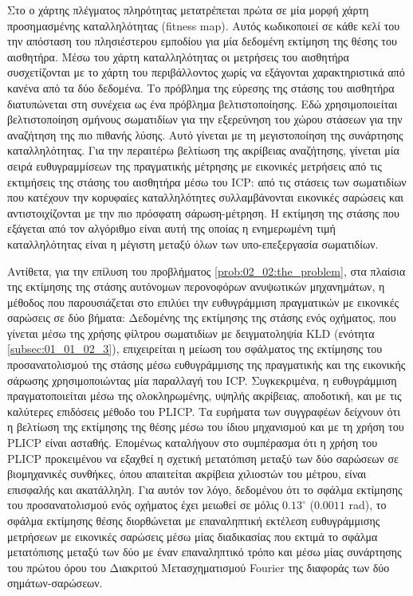 Στο \cite{Zhang2017a} ο χάρτης πλέγματος πληρότητας μετατρέπεται πρώτα σε μία
μορφή χάρτη προσημασμένης καταλληλότητας (fitness map). Αυτός κωδικοποιεί σε
κάθε κελί του την απόσταση του πλησιέστερου εμποδίου για μία δεδομένη εκτίμηση
της θέσης του αισθητήρα. Μέσω του χάρτη καταλληλότητας οι μετρήσεις του
αισθητήρα συσχετίζονται με το χάρτη του περιβάλλοντος χωρίς να εξάγονται
χαρακτηριστικά από κανένα από τα δύο δεδομένα. Το πρόβλημα της εύρεσης της
στάσης του αισθητήρα διατυπώνεται στη συνέχεια ως ένα πρόβλημα βελτιστοποίησης.
Εδώ χρησιμοποιείται βελτιστοποίηση σμήνους σωματιδίων για την εξερεύνηση του
χώρου στάσεων για την αναζήτηση της πιο πιθανής λύσης. Αυτό γίνεται με τη
μεγιστοποίηση της συνάρτησης καταλληλότητας. Για την περαιτέρω βελτίωση της
ακρίβειας αναζήτησης, γίνεται μία σειρά ευθυγραμμίσεων της πραγματικής μέτρησης
με εικονικές μετρήσεις από τις εκτιμήσεις της στάσης του αισθητήρα μέσω του
ICP: από τις στάσεις των σωματιδίων που κατέχουν την κορυφαίες καταλληλότητες
συλλαμβάνονται εικονικές σαρώσεις και αντιστοιχίζονται με την πιο πρόσφατη
σάρωση-μέτρηση. Η εκτίμηση της στάσης που εξάγεται από τον αλγόριθμο είναι
αυτή της οποίας η ενημερωμένη τιμή καταλληλότητας είναι η μέγιστη μεταξύ όλων
των υπο-επεξεργασία σωματιδίων.

Αντίθετα, για την επίλυση του προβλήματος \ref{prob:02_02:the_problem}, στα
πλαίσια της εκτίμησης της στάσης αυτόνομων περονοφόρων ανυψωτικών μηχανημάτων,
η μέθοδος που παρουσιάζεται στο \cite{Vasiljevic2016a} επιλύει την ευθυγράμμιση
πραγματικών με εικονικές σαρώσεις σε δύο βήματα: Δεδομένης της εκτίμησης της
στάσης ενός οχήματος, που γίνεται μέσω της χρήσης φίλτρου σωματιδίων με
δειγματοληψία KLD (ενότητα \ref{subsec:01_01_02_3}), επιχειρείται η μείωση του
σφάλματος της εκτίμησης του προσανατολισμού της στάσης μέσω ευθυγράμμισης της
πραγματικής και της εικονικής σάρωσης χρησιμοποιώντας μία παραλλαγή του ICP.
Συγκεκριμένα, η ευθυγράμμιση πραγματοποιείται μέσω της ολοκληρωμένης, υψηλής
ακρίβειας, αποδοτική, και με τις καλύτερες επιδόσεις μέθοδο του PLICP.  Τα
ευρήματα των συγγραφέων δείχνουν ότι η βελτίωση της εκτίμησης της θέσης μέσω
του ίδιου μηχανισμού και με τη χρήση του PLICP είναι ασταθής. Επομένως
καταλήγουν στο συμπέρασμα ότι η χρήση του PLICP προκειμένου να εξαχθεί η
σχετική μετατόπιση μεταξύ των δύο σαρώσεων σε βιομηχανικές συνθήκες, όπου
απαιτείται ακρίβεια χιλιοστών του μέτρου,  είναι επισφαλής και ακατάλληλη. Για
αυτόν τον λόγο, δεδομένου ότι το σφάλμα εκτίμησης του προσανατολισμού ενός
οχήματος έχει μειωθεί σε μόλις $0.13^\circ$ ($0.0011$ rad), το σφάλμα εκτίμησης
θέσης διορθώνεται με επαναληπτική εκτέλεση ευθυγράμμισης μετρήσεων με εικονικές
σαρώσεις μέσω μίας διαδικασίας που εκτιμά το σφάλμα μετατόπισης μεταξύ των δύο
με έναν επαναληπτικό τρόπο και μέσω μίας συνάρτησης του πρώτου όρου του
Διακριτού Μετασχηματισμού Fourier της διαφοράς των δύο σημάτων-σαρώσεων.

